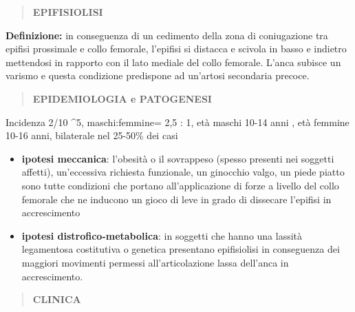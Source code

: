 \documentclass[]{article}
\date{}
\begin{document}
\begin{quote}
\textbf{EPIFISIOLISI}
\end{quote}

\textbf{Definizione:} in conseguenza di un cedimento della zona di
coniugazione tra epifisi prossimale e collo femorale, l'epifisi si
distacca e scivola in basso e indietro mettendosi in rapporto con il
lato mediale del collo femorale. L'anca subisce un varismo e questa
condizione predispone ad un'artosi secondaria precoce.

\begin{quote}
\textbf{EPIDEMIOLOGIA e PATOGENESI}
\end{quote}

Incidenza 2/10 \^{}5, maschi:femmine= 2,5 : 1, età maschi 10-14 anni ,
età femmine 10-16 anni, bilaterale nel 25-50\% dei casi

\begin{itemize}
\item
  \textbf{ipotesi meccanica}: l'obesità o il sovrappeso (spesso presenti
  nei soggetti affetti), un'eccessiva richiesta funzionale, un ginocchio
  valgo, un piede piatto sono tutte condizioni che portano
  all'applicazione di forze a livello del collo femorale che ne inducono
  un gioco di leve in grado di dissecare l'epifisi in accrescimento
\item
  \textbf{ipotesi distrofico-metabolica}: in soggetti che hanno una
  lassità legamentosa costitutiva o genetica presentano epifisiolisi in
  conseguenza dei maggiori movimenti permessi all'articolazione lassa
  dell'anca in accrescimento.
\end{itemize}

\begin{quote}
\textbf{CLINICA}
\end{quote}
\end{document}
